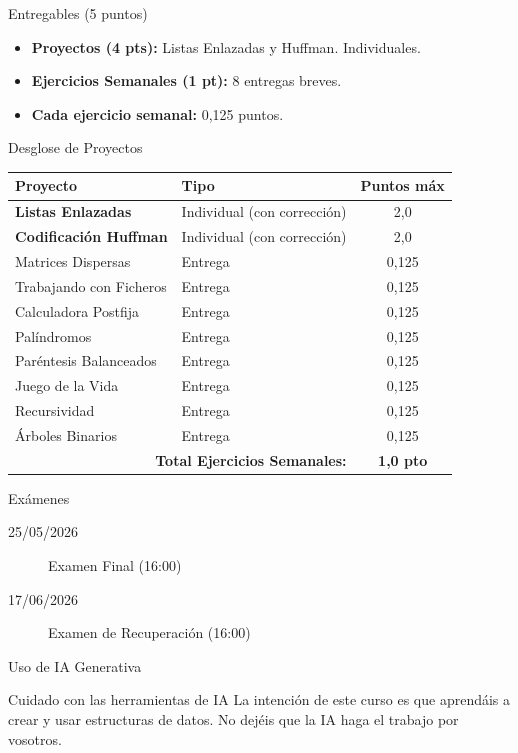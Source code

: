 \documentclass[11pt]{beamer}
\begin{document}
\begin{frame}{Entregables (5 puntos)}
\begin{itemize}
\item \textbf{Proyectos (4 pts):} Listas Enlazadas y Huffman. Individuales.
\item \textbf{Ejercicios Semanales (1 pt):} 8 entregas breves.
\item \textbf{Cada ejercicio semanal:} 0,125 puntos.
\end{itemize}
\end{frame}

\begin{frame}{Desglose de Proyectos}
\centering
\renewcommand{\arraystretch}{1.1}
\tiny
\begin{tabular}{llc}
\toprule
\textbf{Proyecto} & \textbf{Tipo} & \textbf{Puntos máx} \\
\midrule
\textbf{Listas Enlazadas} & Individual (con corrección) & 2,0 \\
\textbf{Codificación Huffman} & Individual (con corrección) & 2,0 \\
\midrule
Matrices Dispersas & Entrega & 0,125 \\
Trabajando con Ficheros & Entrega & 0,125 \\
Calculadora Postfija & Entrega & 0,125 \\
Palíndromos & Entrega & 0,125 \\
Paréntesis Balanceados & Entrega & 0,125 \\
Juego de la Vida & Entrega & 0,125 \\
Recursividad & Entrega & 0,125 \\
Árboles Binarios & Entrega & 0,125 \\
\midrule
\multicolumn{2}{r}{\textbf{Total Ejercicios Semanales:}} & \textbf{1,0 pto} \\
\bottomrule
\end{tabular}
\end{frame}

\begin{frame}{Exámenes}
\begin{description}
\item[25/05/2026] Examen Final (16:00)
\item[17/06/2026] Examen de Recuperación (16:00)
\end{description}
\end{frame}

\begin{frame}{Uso de IA Generativa}
\begin{alertblock}{Cuidado con las herramientas de IA}
La intención de este curso es que aprendáis a crear y usar estructuras de datos. No dejéis que la IA haga el trabajo por vosotros.
\end{alertblock}
\end{frame}
\end{document}

